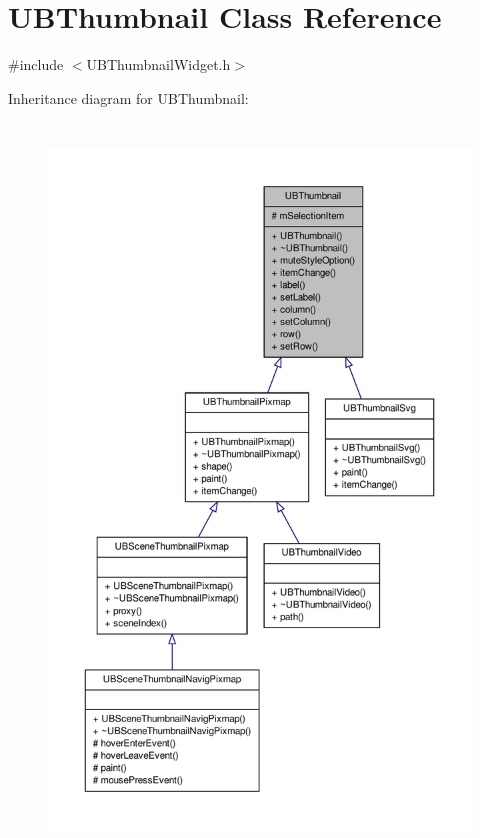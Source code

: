 \hypertarget{class_u_b_thumbnail}{\section{U\-B\-Thumbnail Class Reference}
\label{de/d65/class_u_b_thumbnail}
}


{\ttfamily \#include $<$U\-B\-Thumbnail\-Widget.\-h$>$}



Inheritance diagram for U\-B\-Thumbnail\-:
\nopagebreak
\begin{figure}[H]
\begin{center}
\leavevmode
\includegraphics[height=550pt]{db/d46/class_u_b_thumbnail__inherit__graph}
\end{center}
\end{figure}


